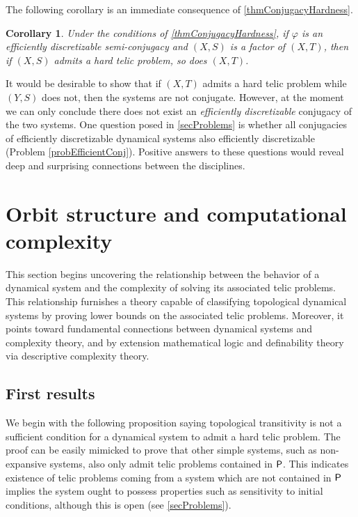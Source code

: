 \documentclass{amsart}
\theoremstyle{theorem}
\newtheorem{corollary}[theorem]{Corollary}
\theoremstyle{remark}
\numberwithin{equation}{section}
\newcommand{\ccP}{\textsf{\upshape P}}
\begin{document}
The following corollary is an immediate consequence of \cref{thmConjugacyHardness}.

\begin{corollary}
Under the conditions of \cref{thmConjugacyHardness}, if $\varphi$ is an efficiently discretizable semi-conjugacy and $(X, S)$ is a factor of $(X, T)$, then if $(X, S)$ admits a hard telic problem, so does $(X, T)$.
\end{corollary}

It would be desirable to show that if $(X, T)$ admits a hard telic problem while $(Y, S)$ does not, then the systems are not conjugate. However, at the moment we can only conclude there does not exist an \emph{efficiently discretizable} conjugacy of the two systems. One question posed in \cref{secProblems} is whether all conjugacies of efficiently discretizable dynamical systems also efficiently discretizable (Problem \ref{probEfficientConj}). Positive answers to these questions would reveal deep and surprising connections between the disciplines.





\section{Orbit structure and computational complexity}\label{secClassification}

This section begins uncovering the relationship between the behavior of a dynamical system and the complexity of solving its associated telic problems. This relationship furnishes a theory capable of classifying topological dynamical systems by proving lower bounds on the associated telic problems. Moreover, it points toward fundamental connections between dynamical systems and complexity theory, and by extension mathematical logic and definability theory via descriptive complexity theory.


\subsection{First results}

We begin with the following proposition saying topological transitivity is not a sufficient condition for a dynamical system to admit a hard telic problem. The proof can be easily mimicked to prove that other simple systems, such as non-expansive systems, also only admit telic problems contained in $\ccP$. This indicates existence of telic problems coming from a system which are not contained in $\ccP$ implies the system ought to possess properties such as sensitivity to initial conditions, although this is open (see \cref{secProblems}).
\end{document}
